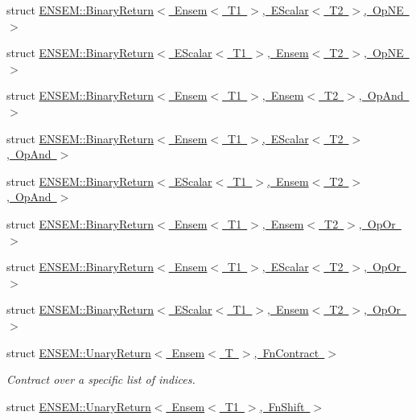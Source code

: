 \begin{DoxyCompactItemize}
\item 
struct \mbox{\hyperlink{structENSEM_1_1BinaryReturn_3_01Ensem_3_01T1_01_4_00_01EScalar_3_01T2_01_4_00_01OpNE_01_4}{E\+N\+S\+E\+M\+::\+Binary\+Return$<$ Ensem$<$ T1 $>$, E\+Scalar$<$ T2 $>$, Op\+N\+E $>$}}
\item 
struct \mbox{\hyperlink{structENSEM_1_1BinaryReturn_3_01EScalar_3_01T1_01_4_00_01Ensem_3_01T2_01_4_00_01OpNE_01_4}{E\+N\+S\+E\+M\+::\+Binary\+Return$<$ E\+Scalar$<$ T1 $>$, Ensem$<$ T2 $>$, Op\+N\+E $>$}}
\item 
struct \mbox{\hyperlink{structENSEM_1_1BinaryReturn_3_01Ensem_3_01T1_01_4_00_01Ensem_3_01T2_01_4_00_01OpAnd_01_4}{E\+N\+S\+E\+M\+::\+Binary\+Return$<$ Ensem$<$ T1 $>$, Ensem$<$ T2 $>$, Op\+And $>$}}
\item 
struct \mbox{\hyperlink{structENSEM_1_1BinaryReturn_3_01Ensem_3_01T1_01_4_00_01EScalar_3_01T2_01_4_00_01OpAnd_01_4}{E\+N\+S\+E\+M\+::\+Binary\+Return$<$ Ensem$<$ T1 $>$, E\+Scalar$<$ T2 $>$, Op\+And $>$}}
\item 
struct \mbox{\hyperlink{structENSEM_1_1BinaryReturn_3_01EScalar_3_01T1_01_4_00_01Ensem_3_01T2_01_4_00_01OpAnd_01_4}{E\+N\+S\+E\+M\+::\+Binary\+Return$<$ E\+Scalar$<$ T1 $>$, Ensem$<$ T2 $>$, Op\+And $>$}}
\item 
struct \mbox{\hyperlink{structENSEM_1_1BinaryReturn_3_01Ensem_3_01T1_01_4_00_01Ensem_3_01T2_01_4_00_01OpOr_01_4}{E\+N\+S\+E\+M\+::\+Binary\+Return$<$ Ensem$<$ T1 $>$, Ensem$<$ T2 $>$, Op\+Or $>$}}
\item 
struct \mbox{\hyperlink{structENSEM_1_1BinaryReturn_3_01Ensem_3_01T1_01_4_00_01EScalar_3_01T2_01_4_00_01OpOr_01_4}{E\+N\+S\+E\+M\+::\+Binary\+Return$<$ Ensem$<$ T1 $>$, E\+Scalar$<$ T2 $>$, Op\+Or $>$}}
\item 
struct \mbox{\hyperlink{structENSEM_1_1BinaryReturn_3_01EScalar_3_01T1_01_4_00_01Ensem_3_01T2_01_4_00_01OpOr_01_4}{E\+N\+S\+E\+M\+::\+Binary\+Return$<$ E\+Scalar$<$ T1 $>$, Ensem$<$ T2 $>$, Op\+Or $>$}}
\item 
struct \mbox{\hyperlink{structENSEM_1_1UnaryReturn_3_01Ensem_3_01T_01_4_00_01FnContract_01_4}{E\+N\+S\+E\+M\+::\+Unary\+Return$<$ Ensem$<$ T $>$, Fn\+Contract $>$}}
\begin{DoxyCompactList}\small\item\em Contract over a specific list of indices. \end{DoxyCompactList}\item 
struct \mbox{\hyperlink{structENSEM_1_1UnaryReturn_3_01Ensem_3_01T1_01_4_00_01FnShift_01_4}{E\+N\+S\+E\+M\+::\+Unary\+Return$<$ Ensem$<$ T1 $>$, Fn\+Shift $>$}}

\end{DoxyCompactItemize}
